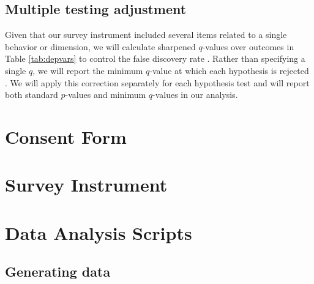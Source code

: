 \documentclass[11pt, a4paper]{article}\usepackage[]{graphicx}\usepackage[]{color}
\begin{document}
    \subsection{Multiple testing adjustment}

        Given that our survey instrument included several items related to a single behavior or dimension, we will calculate sharpened $q$-values over outcomes in Table \ref{tab:depvars} to control the false discovery rate \parencite{benjamini_adaptive_2006}. Rather than specifying a single $q$, we will report the minimum $q$-value at which each hypothesis is rejected \parencite{anderson_multiple_2008}. We will apply this correction separately for each hypothesis test and will report both standard $p$-values and minimum $q$-values in our analysis.

\newpage

\printbibliography

\newpage

\appendix

\section{Consent Form}
\section{Survey Instrument}
\section{Data Analysis Scripts} \label{sec:rscripts}

    \subsection{Generating data}
\end{document}
